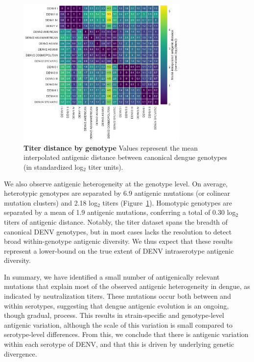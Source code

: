 \documentclass[11pt,oneside,letterpaper]{article}
\begin{document}
\begin{figure}[ht]
\centering
	\includegraphics[width=0.75\textwidth]{../figures/png/genotype_dTiter_heatmap.png}
	\caption{\textbf{Titer distance by genotype}
  Values represent the mean interpolated antigenic distance between canonical dengue genotypes (in standardized log$_2$ titer units).
  }
	\label{genotype_dTiter_heatmap}
\end{figure}

We also observe antigenic heterogeneity at the genotype level.
On average, heterotypic genotypes are separated by 6.9 antigenic mutations (or colinear mutation clusters) and 2.18 log$_2$ titers (Figure~\ref{genotype_dTiter_heatmap}).
Homotypic genotypes are separated by a mean of 1.9 antigenic mutations, conferring a total of 0.30 log$_2$ titers of antigenic distance.
Notably, the titer dataset spans the breadth of canonical DENV genotypes, but in most cases lacks the resolution to detect broad within-genotype antigenic diversity.
We thus expect that these results represent a lower-bound on the true extent of DENV intraserotype antigenic diversity.

In summary, we have identified a small number of antigenically relevant mutations that explain most of the observed antigenic heterogeneity in dengue, as indicated by neutralization titers.
These mutations occur both between and within serotypes, suggesting that dengue antigenic evolution is an ongoing, though gradual, process.
This results in strain-specific and genotype-level antigenic variation, although the scale of this variation is small compared to serotype-level differences.
From this, we conclude that there is antigenic variation within each serotype of DENV, and that this is driven by underlying genetic divergence.
\end{document}
